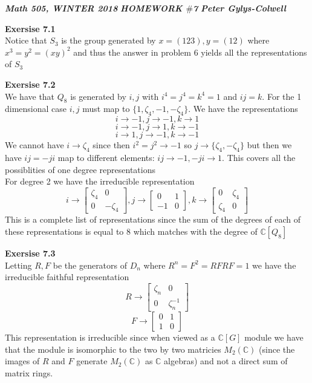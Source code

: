 \documentclass[12pt]{article}
\newenvironment{ques}[1]{\textbf{Exersise #1}\vspace{1 mm}\\ }{\bigskip}
\theoremstyle{definition}
\newcommand{\C}{\mathbb C}
\begin{document}
\noindent \textit{\textbf{Math 505, WINTER 2018}} \hspace{1.3cm}
\textit{\textbf{HOMEWORK $\#$7}} \hspace{1.3cm} \textit{\textbf{Peter
Gylys-Colwell}} 

\vspace{1cm}

\begin{ques}{7.1}
	Notice that $S_3$ is the group generated by $x = (123), y = (12)$ where $x^3
	= y^2 = (xy)^2$ and thus the answer in problem $6$ yields all the
	representations of $S_3$
\end{ques}

\begin{ques}{7.2}
	We have that $Q_8$ is generated by $i,j$ with $i^4 = j^4 = k^4 = 1$ and $ij = k$.
	For the 1 dimensional case $i, j$ must map to $\{1, \zeta_4, -1,
	-\zeta_4\}$. We have the representations
	$$i \to -1, j \to -1, k \to 1$$
	$$i \to -1, j \to 1, k \to -1$$
	$$i \to 1, j \to -1, k \to -1$$
	We cannot have $i \to \zeta_4$
	since then $i^2 = j^2 \to -1$ so $j \to
	\{\zeta_4, -\zeta_4 \}$ but then we have $ij = -ji$ map to different
	elements: $ij \to -1, -ji \to 1$. This covers all the possiblities of one
	degree representations \\
	For degree 2 we have the irreducible representation
	$$i \to
	\begin{bmatrix}
	\zeta_4 & 0\\
	0 & -\zeta_4
	\end{bmatrix}, 
	j \to 
	\begin{bmatrix}
	0 & 1\\
	-1 & 0
	\end{bmatrix},
	k \to 
	\begin{bmatrix}
	0 & \zeta_4\\
	\zeta_4 & 0
	\end{bmatrix}
	$$
	This is a complete list of representations since the sum
	of the degrees of each of these representations is equal to $8$ which
	matches with the degree of $\C[Q_8]$
\end{ques}

\begin{ques}{7.3}
	Letting $R,F$ be the generators of $D_n$ where $R^n = F^2 = RFRF = 1$ we
	have the irreducible faithful representation
	$$R \to 
	\begin{bmatrix}
	\zeta_n & 0\\
	0 & \zeta_n^{-1}
	\end{bmatrix}$$
	$$F \to 
	\begin{bmatrix}
	0 & 1\\
	1 & 0
	\end{bmatrix}$$
	This representation is irreducible since when viewed as a $\C[G]$ module we
	have that the module is isomorphic to the two by two matricies $M_2(\C)$
	(since the images of $R$ and $F$ generate $M_2(\C)$ as $\C$ algebras)
	and not a direct sum of matrix rings. 
\end{ques}
\end{document}
